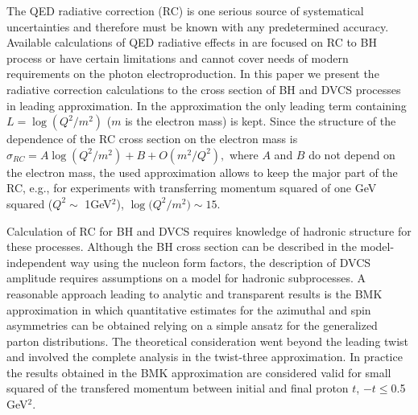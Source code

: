 \documentclass[aps,prd,reprint,groupedaddress,preprintnumbers,showpacs]{revtex4-1}
\begin{document}
The QED radiative correction (RC) is one serious source of systematical uncertainties and therefore must be known with  any predetermined accuracy. Available calculations of QED radiative effects in \cite{Vanderhaeghen2000,ByKuTo2008PRC,AkushevichIlyichev2012,AISh2014}
are focused on RC to BH process or have certain limitations and cannot cover needs of modern requirements on the photon electroproduction. In this paper we present the radiative correction calculations to the cross section of BH and DVCS processes in leading approximation. In the approximation the only leading term containing $L=\log(Q^2/m^2)$ ($m$ is the electron mass)
 is 
kept.   
Since the structure of the dependence of the RC cross section
on the electron mass is 
$
\sigma_{RC}=A\log({Q^2}/{m^2})+B+O(m^2/Q^2),
$
where $A$ and $B$ do not depend on the electron mass, the used approximation allows to keep the major part of the RC, e.g., for experiments with transferring momentum squared of one GeV squared ($Q^2 \sim$ 1GeV$^2$), $\log\bigl({Q^2}/{m^2}\bigr) \sim 15$.

Calculation of RC for BH and DVCS requires knowledge of hadronic structure for these processes. Although the BH cross section can be described in the model-independent way using the nucleon form factors, the description of DVCS amplitude requires assumptions on a model for hadronic subprocesses. A reasonable approach leading to analytic and transparent results is the BMK approximation \cite{BKM2002} in which  quantitative
estimates for the azimuthal and spin asymmetries can be obtained relying on a simple ansatz for the generalized parton distributions. The theoretical consideration went beyond the leading twist and involved the complete analysis in the twist-three approximation. In practice the results obtained in the BMK approximation are considered valid for 
small squared of the transfered momentum between initial and final proton $t$, $-t\leq$0.5 GeV$^2$.
\end{document}
